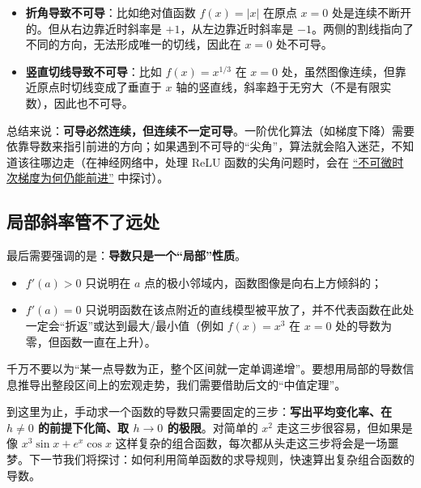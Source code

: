 \begin{itemize}
\tightlist
  \item \textbf{折角导致不可导}：比如绝对值函数 \(f(x)=|x|\) 在原点 \(x=0\) 处是连续不断开的。但从右边靠近时斜率是 \(+1\)，从左边靠近时斜率是 \(-1\)。两侧的割线指向了不同的方向，无法形成唯一的切线，因此在 \(x=0\) 处不可导。
  \item \textbf{竖直切线导致不可导}：比如 \(f(x)=x^{1/3}\) 在 \(x=0\) 处，虽然图像连续，但靠近原点时切线变成了垂直于 \(x\) 轴的竖直线，斜率趋于无穷大（不是有限实数），因此也不可导。
\end{itemize}

总结来说：\textbf{可导必然连续，但连续不一定可导}。一阶优化算法（如梯度下降）需要依靠导数来指引前进的方向；如果遇到不可导的``尖角''，算法就会陷入迷茫，不知道该往哪边走（在神经网络中，处理 ReLU 函数的尖角问题时，会在 \hyperref[sec:09-Convex-Optimization/06-Optimization-Algorithms/03]{``不可微时次梯度为何仍能前进''} 中探讨）。

\subsection{局部斜率管不了远处}

最后需要强调的是：\textbf{导数只是一个``局部''性质}。

\begin{itemize}
\tightlist
  \item \(f'(a)>0\) 只说明在 \(a\) 点的极小邻域内，函数图像是向右上方倾斜的；
  \item \(f'(a)=0\) 只说明函数在该点附近的直线模型被平放了，并不代表函数在此处一定会``折返''或达到最大/最小值（例如 \(f(x)=x^3\) 在 \(x=0\) 处的导数为零，但函数一直在上升）。
\end{itemize}

千万不要以为``某一点导数为正，整个区间就一定单调递增''。要想用局部的导数信息推导出整段区间上的宏观走势，我们需要借助后文的``中值定理''。

到这里为止，手动求一个函数的导数只需要固定的三步：\textbf{写出平均变化率、在 \(h\neq0\) 的前提下化简、取 \(h\to0\) 的极限}。对简单的 \(x^2\) 走这三步很容易，但如果是像 \(x^3\sin x+e^x\cos x\) 这样复杂的组合函数，每次都从头走这三步将会是一场噩梦。下一节我们将探讨：如何利用简单函数的求导规则，快速算出复杂组合函数的导数。